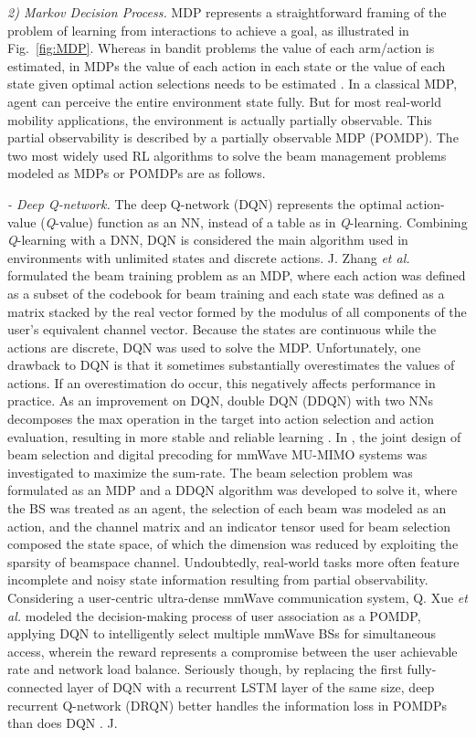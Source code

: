 \documentclass[journal,comsoc]{IEEEtran}
\begin{document}
\emph{2) Markov Decision Process.} MDP represents a straightforward framing of the problem of learning from interactions to achieve a goal, as illustrated in Fig.~\ref{fig:MDP}. Whereas in bandit problems the value of each arm/action is estimated, in MDPs the value of each action in each state or the value of each state given optimal action selections needs to be estimated \cite{Reinforcement-Learning-2018}. In a classical MDP, agent can perceive the entire environment state fully. But for most real-world mobility applications, the environment is actually partially observable. This partial observability is described by a partially observable MDP (POMDP). The two most widely used RL algorithms to solve the beam management problems modeled as MDPs or POMDPs are as follows.

\emph{- Deep Q-network.} The deep Q-network (DQN) represents the optimal action-value (\emph{Q}-value) function as an NN, instead of a table as in \emph{Q}-learning. Combining \emph{Q}-learning with a DNN, DQN is considered the main algorithm used in environments with unlimited states and discrete actions. J. Zhang \emph{et al.} \cite{Intelligent-Interactive-Beam-Training-2021} formulated the beam training problem as an MDP, where each action was defined as a subset of the codebook for beam training and each state was defined as a matrix stacked by the real vector formed by the modulus of all components of the user's equivalent channel vector. Because the states are continuous while the actions are discrete, DQN was used to solve the MDP. Unfortunately, one drawback to DQN is that it sometimes substantially overestimates the values of actions. If an overestimation do occur, this negatively affects performance in practice. As an improvement on DQN, double DQN (DDQN) with two NNs decomposes the max operation in the target into action selection and action evaluation, resulting in more stable and reliable learning \cite{Double-Q-Learning-2016}. In \cite{Joint-Deep-Reinforcement-Learning-Unfolding-2021}, the joint design of beam selection and digital precoding for mmWave MU-MIMO systems was investigated to maximize the sum-rate. The beam selection problem was formulated as an MDP and a DDQN algorithm was developed to solve it, where the BS was treated as an agent, the selection of each beam was modeled as an action, and the channel matrix and an indicator tensor used for beam selection composed the state space, of which the dimension was reduced by exploiting the sparsity of beamspace channel. Undoubtedly, real-world tasks more often feature incomplete and noisy state information resulting from partial observability. Considering a user-centric ultra-dense mmWave communication system, Q. Xue \emph{et al.} \cite{User-Centric-Association-Ultra-Dense-mmWave-2021} modeled the decision-making process of user association as a POMDP, applying DQN to intelligently select multiple mmWave BSs for simultaneous access, wherein the reward represents a compromise between the user achievable rate and network load balance. Seriously though, by replacing the first fully-connected layer of DQN with a recurrent LSTM layer of the same size, deep recurrent Q-network (DRQN) better handles the information loss in POMDPs than does DQN \cite{Deep-Recurrent-Q-Learning}. J. 
\end{document}
